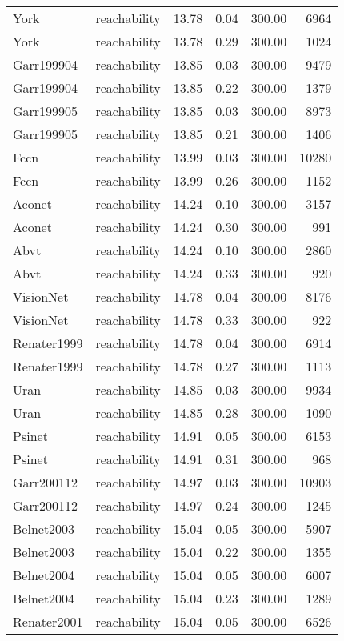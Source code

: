\begin{tabular}{llrrrr}
York & reachability & 13.78 & 0.04 & 300.00 & 6964 \\
York & reachability & 13.78 & 0.29 & 300.00 & 1024 \\
Garr199904 & reachability & 13.85 & 0.03 & 300.00 & 9479 \\
Garr199904 & reachability & 13.85 & 0.22 & 300.00 & 1379 \\
Garr199905 & reachability & 13.85 & 0.03 & 300.00 & 8973 \\
Garr199905 & reachability & 13.85 & 0.21 & 300.00 & 1406 \\
Fccn & reachability & 13.99 & 0.03 & 300.00 & 10280 \\
Fccn & reachability & 13.99 & 0.26 & 300.00 & 1152 \\
Aconet & reachability & 14.24 & 0.10 & 300.00 & 3157 \\
Aconet & reachability & 14.24 & 0.30 & 300.00 & 991 \\
Abvt & reachability & 14.24 & 0.10 & 300.00 & 2860 \\
Abvt & reachability & 14.24 & 0.33 & 300.00 & 920 \\
VisionNet & reachability & 14.78 & 0.04 & 300.00 & 8176 \\
VisionNet & reachability & 14.78 & 0.33 & 300.00 & 922 \\
Renater1999 & reachability & 14.78 & 0.04 & 300.00 & 6914 \\
Renater1999 & reachability & 14.78 & 0.27 & 300.00 & 1113 \\
Uran & reachability & 14.85 & 0.03 & 300.00 & 9934 \\
Uran & reachability & 14.85 & 0.28 & 300.00 & 1090 \\
Psinet & reachability & 14.91 & 0.05 & 300.00 & 6153 \\
Psinet & reachability & 14.91 & 0.31 & 300.00 & 968 \\
Garr200112 & reachability & 14.97 & 0.03 & 300.00 & 10903 \\
Garr200112 & reachability & 14.97 & 0.24 & 300.00 & 1245 \\
Belnet2003 & reachability & 15.04 & 0.05 & 300.00 & 5907 \\
Belnet2003 & reachability & 15.04 & 0.22 & 300.00 & 1355 \\
Belnet2004 & reachability & 15.04 & 0.05 & 300.00 & 6007 \\
Belnet2004 & reachability & 15.04 & 0.23 & 300.00 & 1289 \\
Renater2001 & reachability & 15.04 & 0.05 & 300.00 & 6526 \\

\end{tabular}
